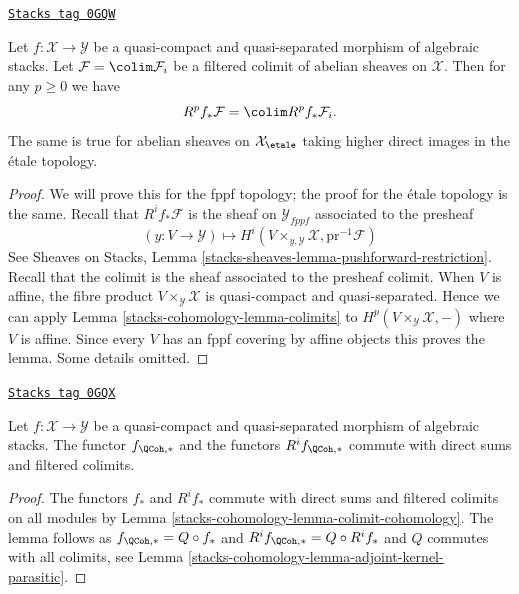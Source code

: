 \begin{lemma}
\label{stacks-cohomology-lemma-colimit-cohomology}
\href{https://stacks.math.columbia.edu/tag/0GQW}{\texttt{Stacks tag 0GQW}}

Let $f : \mathcal{X} \to \mathcal{Y}$ be a quasi-compact and quasi-separated
morphism of algebraic stacks. Let $\mathcal{F} = \colim \mathcal{F}_i$
be a filtered colimit of abelian sheaves on $\mathcal{X}$.
Then for any $p \geq 0$ we have
$$
R^pf_*\mathcal{F} = \colim R^pf_*\mathcal{F}_i.
$$
The same is true for abelian sheaves on $\mathcal{X}_\etale$
taking higher direct images in the \'etale topology.
\end{lemma}

\begin{proof}
We will prove this for the fppf topology; the proof for the \'etale
topology is the same. Recall that $R^if_*\mathcal{F}$ is the sheaf on
$\mathcal{Y}_{fppf}$ associated to the presheaf
$$
(y : V \to \mathcal{Y})
\longmapsto
H^i(V \times_{y, \mathcal{Y}} \mathcal{X}, \text{pr}^{-1}\mathcal{F})
$$
See
Sheaves on Stacks, Lemma \ref{stacks-sheaves-lemma-pushforward-restriction}.
Recall that the colimit is the sheaf associated to the presheaf colimit.
When $V$ is affine, the fibre product $V \times_\mathcal{Y} \mathcal{X}$
is quasi-compact and quasi-separated. Hence we can apply
Lemma \ref{stacks-cohomology-lemma-colimits} to $H^p(V \times_\mathcal{Y} \mathcal{X}, -)$
where $V$ is affine. Since every $V$ has an fppf covering by
affine objects this proves the lemma. Some details omitted.
\end{proof}

\begin{lemma}
\label{stacks-cohomology-lemma-quasi-coherent-pushforward-direct-sums}
\href{https://stacks.math.columbia.edu/tag/0GQX}{\texttt{Stacks tag 0GQX}}

Let $f : \mathcal{X} \to \mathcal{Y}$ be a quasi-compact and quasi-separated
morphism of algebraic stacks. The functor $f_{\QCoh, *}$
and the functors $R^if_{\QCoh, *}$ commute with direct sums
and filtered colimits.
\end{lemma}

\begin{proof}
The functors $f_*$ and $R^if_*$ commute with direct sums and filtered
colimits on all modules by Lemma \ref{stacks-cohomology-lemma-colimit-cohomology}.
The lemma follows as $f_{\QCoh, *} = Q \circ f_*$ and
$R^if_{\QCoh, *} = Q \circ R^if_*$ and $Q$ commutes with
all colimits, see Lemma \ref{stacks-cohomology-lemma-adjoint-kernel-parasitic}.
\end{proof}

